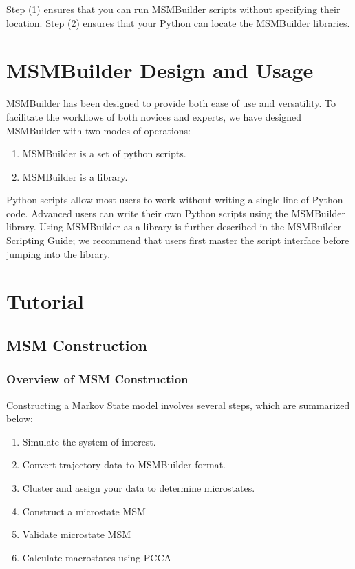 \documentclass[12pt]{article}
\begin{document}
Step (1) ensures that you can run MSMBuilder scripts without specifying their location.  Step (2) ensures that your Python can locate the MSMBuilder libraries.  

\newpage

\section{MSMBuilder Design and Usage}

MSMBuilder has been designed to provide both ease of use and versatility.  To facilitate the workflows of both novices and experts, we have designed MSMBuilder with two modes of operations:

\begin{enumerate}
\item MSMBuilder is a set of python scripts.  
\item MSMBuilder is a library.
\end{enumerate}

Python scripts allow most users to work without writing a single line of Python code.  Advanced users can write their own Python scripts using the MSMBuilder library.  Using MSMBuilder as a library is further described in the MSMBuilder Scripting Guide; we recommend that users first master the script interface before jumping into the library.  

\newpage

\section{Tutorial}
\subsection{MSM Construction}

\subsubsection{Overview of MSM Construction}
Constructing a Markov State model involves several steps, which are summarized below:
\begin{enumerate}
 \item Simulate the system of interest.
 \item Convert trajectory data to MSMBuilder format.
 \item Cluster and assign your data to determine microstates.
 \item Construct a microstate MSM
 \item Validate microstate MSM
 \item Calculate macrostates using PCCA+
\end{enumerate}
\end{document}
